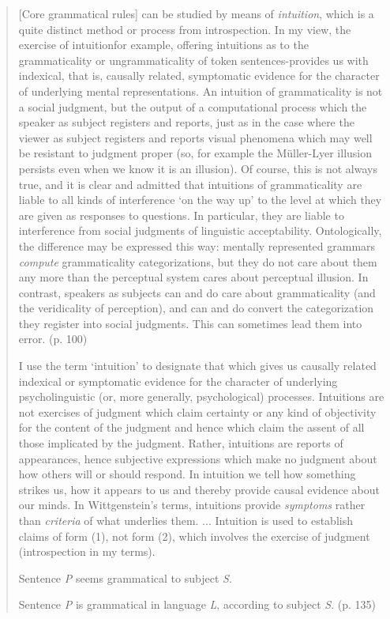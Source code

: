 \begin{quote}
[Core grammatical rules] can be studied by means of \textit{intuition}, which is a quite distinct method or process from introspection. In my view, the exercise of intuition\schdash{}for example, offering intuitions as to the grammaticality or ungrammaticality of token sentences-provides us with indexical, that is, causally related, symptomatic evidence for the character of underlying mental representations. An intuition of grammaticality is not a social judgment, but the output of a computational process which the speaker as subject registers and reports, just as in the case where the viewer as subject registers and reports visual phenomena which may well be resistant to judgment proper (so, for example the Müller-Lyer illusion persists even when we know it is an illusion). Of course, this is not always true, and it is clear and admitted that intuitions of grammaticality are liable to all kinds of interference `on the way up' to the level at which they are given as responses to questions. In particular, they are liable to interference from social judgments of linguistic acceptability. Ontologically, the difference may be expressed this way: mentally represented grammars \textit{compute} grammaticality categorizations, but they do not care about them any more than the perceptual system cares about perceptual illusion. In contrast, speakers as subjects can and do care about grammaticality (and the veridicality of perception), and can and do convert the categorization they register into social judgments. This can sometimes lead them into error. (p. 100)

I use the term `intuition' to designate that which gives us causally related indexical or symptomatic evidence for the character of underlying psycholinguistic (or, more generally, psychological) processes. Intuitions are not exercises of judgment which claim certainty or any kind of objectivity for the content of the judgment and hence which claim the assent of all those implicated by the judgment. Rather, intuitions are reports of appearances, hence subjective expressions which make no judgment about how others will or should respond. In intuition we tell how something strikes us, how it appears to us and thereby provide causal evidence about our minds. In Wittgenstein's terms, intuitions provide \textit{symptoms} rather than \textit{criteria} of what underlies them. ... Intuition is used to establish claims of form (1), not form (2), which involves the exercise of judgment (introspection in my terms).

\begin{exe}
Sentence \textit{P} seems grammatical to subject \textit{S}.
\end{exe}

\begin{exe}
	  Sentence \textit{P} is grammatical in language \textit{L}, according to subject
\textit{S}. (p. 135)
\end{exe}

\end{quote}

